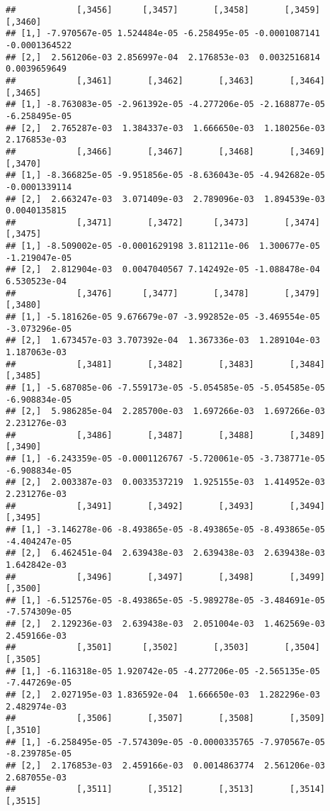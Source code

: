 \documentclass[
]{article}
\begin{document}
\begin{verbatim}
##            [,3456]      [,3457]       [,3458]       [,3459]       [,3460]
## [1,] -7.970567e-05 1.524484e-05 -6.258495e-05 -0.0001087141 -0.0001364522
## [2,]  2.561206e-03 2.856997e-04  2.176853e-03  0.0032516814  0.0039659649
##            [,3461]       [,3462]       [,3463]       [,3464]       [,3465]
## [1,] -8.763083e-05 -2.961392e-05 -4.277206e-05 -2.168877e-05 -6.258495e-05
## [2,]  2.765287e-03  1.384337e-03  1.666650e-03  1.180256e-03  2.176853e-03
##            [,3466]       [,3467]       [,3468]       [,3469]       [,3470]
## [1,] -8.366825e-05 -9.951856e-05 -8.636043e-05 -4.942682e-05 -0.0001339114
## [2,]  2.663247e-03  3.071409e-03  2.789096e-03  1.894539e-03  0.0040135815
##            [,3471]       [,3472]      [,3473]       [,3474]       [,3475]
## [1,] -8.509002e-05 -0.0001629198 3.811211e-06  1.300677e-05 -1.219047e-05
## [2,]  2.812904e-03  0.0047040567 7.142492e-05 -1.088478e-04  6.530523e-04
##            [,3476]      [,3477]       [,3478]       [,3479]       [,3480]
## [1,] -5.181626e-05 9.676679e-07 -3.992852e-05 -3.469554e-05 -3.073296e-05
## [2,]  1.673457e-03 3.707392e-04  1.367336e-03  1.289104e-03  1.187063e-03
##            [,3481]       [,3482]       [,3483]       [,3484]       [,3485]
## [1,] -5.687085e-06 -7.559173e-05 -5.054585e-05 -5.054585e-05 -6.908834e-05
## [2,]  5.986285e-04  2.285700e-03  1.697266e-03  1.697266e-03  2.231276e-03
##            [,3486]       [,3487]       [,3488]       [,3489]       [,3490]
## [1,] -6.243359e-05 -0.0001126767 -5.720061e-05 -3.738771e-05 -6.908834e-05
## [2,]  2.003387e-03  0.0033537219  1.925155e-03  1.414952e-03  2.231276e-03
##            [,3491]       [,3492]       [,3493]       [,3494]       [,3495]
## [1,] -3.146278e-06 -8.493865e-05 -8.493865e-05 -8.493865e-05 -4.404247e-05
## [2,]  6.462451e-04  2.639438e-03  2.639438e-03  2.639438e-03  1.642842e-03
##            [,3496]       [,3497]       [,3498]       [,3499]       [,3500]
## [1,] -6.512576e-05 -8.493865e-05 -5.989278e-05 -3.484691e-05 -7.574309e-05
## [2,]  2.129236e-03  2.639438e-03  2.051004e-03  1.462569e-03  2.459166e-03
##            [,3501]      [,3502]       [,3503]       [,3504]       [,3505]
## [1,] -6.116318e-05 1.920742e-05 -4.277206e-05 -2.565135e-05 -7.447269e-05
## [2,]  2.027195e-03 1.836592e-04  1.666650e-03  1.282296e-03  2.482974e-03
##            [,3506]       [,3507]       [,3508]       [,3509]       [,3510]
## [1,] -6.258495e-05 -7.574309e-05 -0.0000335765 -7.970567e-05 -8.239785e-05
## [2,]  2.176853e-03  2.459166e-03  0.0014863774  2.561206e-03  2.687055e-03
##            [,3511]       [,3512]       [,3513]       [,3514]       [,3515]

\end{verbatim}
\end{document}
